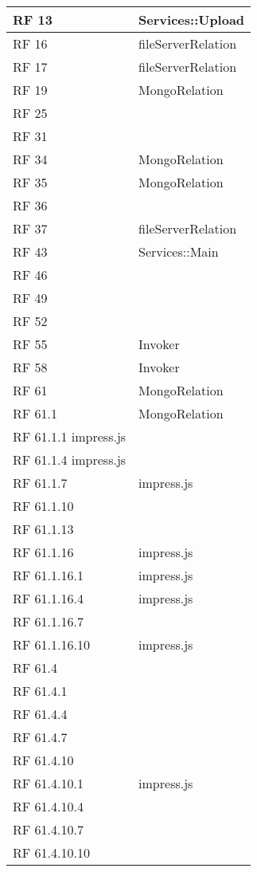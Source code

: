 \begin{center}
\begin{longtable}{ | p{2cm} | p{12cm} | }
 \hline 
RF 13 & Services::Upload\\ 
 \hline 
RF 16 & fileServerRelation\\ 
 \hline 
RF 17 & fileServerRelation\\ 
 \hline 
RF 19 & MongoRelation\\ 
 \hline 
RF 25 & \\ 
 \hline 
RF 31 & \\ 
 \hline 
RF 34 & MongoRelation\\ 
 \hline 
RF 35 & MongoRelation\\ 
 \hline 
RF 36 & \\ 
 \hline 
RF 37 & fileServerRelation\\ 
 \hline 
RF 43 & Services::Main\\ 
 \hline 
RF 46 & \\ 
 \hline 
RF 49 & \\ 
 \hline 
RF 52 & \\ 
 \hline 
RF 55 & Invoker\\ 
 \hline 
RF 58 & Invoker\\ 
 \hline 
RF 61 & MongoRelation\\ 
 \hline 
RF 61.1 & MongoRelation\\ 
 \hline 
RF 61.1.1 impress.js\\ 
 \hline 
RF 61.1.4 impress.js\\ 
 \hline 
RF 61.1.7 & impress.js\\ 
 \hline 
RF 61.1.10 & \\ 
 \hline 
RF 61.1.13 & \\ 
 \hline 
RF 61.1.16 & impress.js\\ 
 \hline 
RF 61.1.16.1 & impress.js\\ 
 \hline 
RF 61.1.16.4 & impress.js\\ 
 \hline 
RF 61.1.16.7 & \\ 
 \hline 
RF 61.1.16.10 & impress.js\\ 
 \hline 
RF 61.4 & \\ 
 \hline 
RF 61.4.1 & \\ 
 \hline 
RF 61.4.4 & \\ 
 \hline 
RF 61.4.7 & \\ 
 \hline 
RF 61.4.10 & \\ 
 \hline 
RF 61.4.10.1 & impress.js\\ 
 \hline 
RF 61.4.10.4 & \\ 
 \hline 
RF 61.4.10.7 & \\ 
 \hline 
RF 61.4.10.10 & \\ 

\end{longtable}
\end{center}
